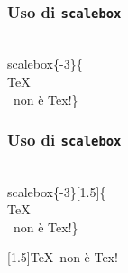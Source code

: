 \documentclass[svgnames,%
	ucs,%
	pdftex]{guitbeamer}
\begin{document}
\begin{frame}
  \frametitle{Uso di \texttt{scalebox}}
	\begin{LaTeXcode}
		\\scalebox\{\alert{-3}\}\{\\TeX\\ \ non \`e Tex!\}
	\end{LaTeXcode}
	\begin{LaTeXoutput}
	\end{LaTeXoutput}
\end{frame}
\begin{frame}
  \frametitle{Uso di \texttt{scalebox}}
	\begin{LaTeXcode}
		\\scalebox\{-3\}\alert{[1.5]}\{\\TeX\\ \ non \`e Tex!\}
	\end{LaTeXcode}
	\begin{LaTeXoutput}
		\scalebox{-3}[1.5]{\TeX\ non \`e Tex!}
	\end{LaTeXoutput}
\end{frame}
\end{document}
